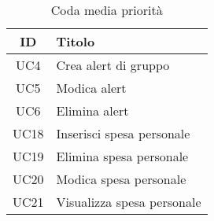     \begin{table}[H]
        \centering
        \begin{tabular}{|c|l|}
        \hline
        \textbf{ID} & \textbf{Titolo} \\ \hline
        UC4 & Crea alert di gruppo\\ \hline
        UC5 & Modica alert \\ \hline
        UC6 & Elimina alert \\ \hline
        UC18 & Inserisci spesa personale \\ \hline
        UC19 & Elimina spesa personale \\ \hline
        UC20 & Modica spesa personale \\ \hline
        UC21 & Visualizza spesa personale \\ \hline
        \end{tabular}
        \caption{Coda media priorità}
    \end{table}

